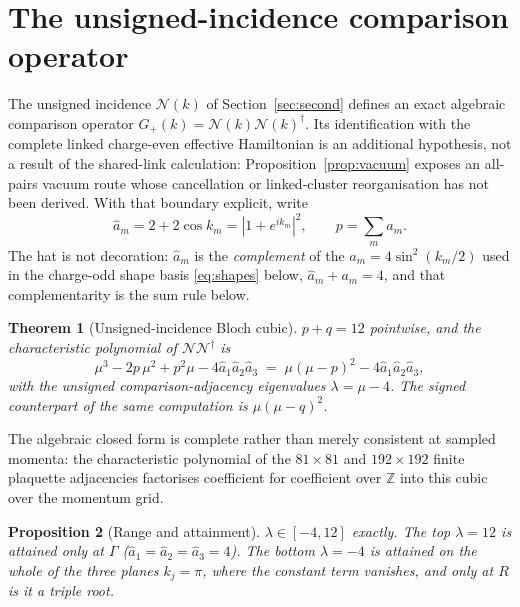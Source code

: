 \documentclass[11pt]{article}
\theoremstyle{plain}
\newtheorem{theorem}{Theorem}
\newtheorem{proposition}[theorem]{Proposition}
\theoremstyle{definition}
\theoremstyle{remark}
\newcommand{\chk}[1]{}
\newcommand{\dg}{^{\dagger}}
\begin{document}
\section{The unsigned-incidence comparison operator}
\label{sec:even}

The unsigned incidence $\mathcal N(k)$ of Section~\ref{sec:second} defines an
exact algebraic comparison operator
$G_+(k)=\mathcal N(k)\mathcal N(k)\dg$. Its identification with the complete
linked charge-even effective Hamiltonian is an additional hypothesis, not a
result of the shared-link calculation: Proposition~\ref{prop:vacuum} exposes
an all-pairs vacuum route whose cancellation or linked-cluster reorganisation
has not been derived. With that boundary explicit, write
\[
  \hat a_m=2+2\cos k_m=|1+e^{ik_m}|^2,\qquad p=\sum_m \hat a_m .
\]
The hat is not decoration: $\hat a_m$ is the \emph{complement} of the
$a_m=4\sin^2(k_m/2)$ used in the charge-odd shape basis \eqref{eq:shapes}
below,
$\hat a_m+a_m=4$, and that complementarity is the sum rule below.

\begin{theorem}[Unsigned-incidence Bloch cubic]\label{thm:evencubic}
$p+q=12$ pointwise, and the characteristic polynomial of
$\mathcal N\mathcal N\dg$ is
\[
  \mu^3-2p\,\mu^2+p^2\mu-4\hat a_1\hat a_2\hat a_3
  \;=\;\mu(\mu-p)^2-4\hat a_1\hat a_2\hat a_3 ,
\]
with the unsigned comparison-adjacency eigenvalues $\lambda=\mu-4$. The signed
counterpart of the same computation is $\mu(\mu-q)^2$.
\end{theorem}
\chk{the unsigned-incidence characteristic polynomial is mu(mu - p)\^{}2 = 4 a\_1 a\_2 a\_3}
\chk{p + q = 12: one zone function runs both sectors}

The algebraic closed form is complete rather than merely consistent at sampled momenta:
the characteristic polynomial of the $81\times81$ and $192\times192$ finite
plaquette adjacencies factorises coefficient for coefficient over $\mathbb Z$
into this cubic over the momentum grid.
\chk{the Bloch cubic IS the finite L = 3 and L = 4 plaquette spectrum, exactly}

\begin{proposition}[Range and attainment]\label{prop:evenrange}
$\lambda\in[-4,12]$ exactly. The top $\lambda=12$ is attained only at $\Gamma$
($\hat a_1=\hat a_2=\hat a_3=4$). The bottom $\lambda=-4$ is attained on the
whole of the three planes $k_j=\pi$, where the constant term vanishes, and only
at $R$ is it a triple root.
\end{proposition}
\end{document}
